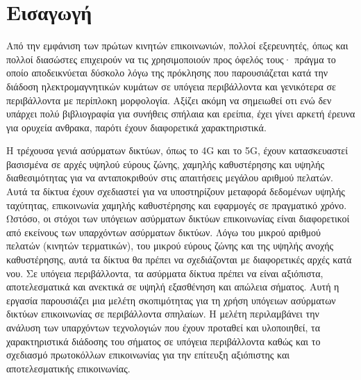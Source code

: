 \section{\textsf{Εισαγωγή}}
    Από την εμφάνιση των πρώτων κινητών επικοινωνιών, πολλοί εξερευνητές, όπως και
    πολλοί διασώστες επιχειρούν να τις χρησιμοποιούν προς όφελός τους· πράγμα το οποίο
    αποδεικνύεται δύσκολο λόγω της πρόκλησης που παρουσιάζεται κατά την διάδοση
    ηλεκτρομαγνητικών κυμάτων σε υπόγεια περιβάλλοντα και γενικότερα σε περιβάλλοντα
    με περίπλοκη μορφολογία. Αξίζει ακόμη να σημειωθεί οτι ενώ δεν υπάρχει πολύ
    βιβλιογραφία για συνήθεις σπήλαια και ερείπια, έχει γίνει αρκετή έρευνα για
    ορυχεία ανθρακα, παρότι έχουν διαφορετικά χαρακτηριστικά.

    Η τρέχουσα γενιά ασύρματων δικτύων, όπως το 4G και το 5G, έχουν κατασκευαστεί
    βασισμένα σε αρχές υψηλού εύρους ζώνης, χαμηλής καθυστέρησης και υψηλής
    διαθεσιμότητας για να ανταποκριθούν στις απαιτήσεις μεγάλου αριθμού πελατών. Αυτά
    τα δίκτυα έχουν σχεδιαστεί για να υποστηρίζουν μεταφορά δεδομένων υψηλής
    ταχύτητας, επικοινωνία χαμηλής καθυστέρησης και εφαρμογές σε πραγματικό χρόνο.
    Ωστόσο, οι στόχοι των υπόγειων ασύρματων δικτύων επικοινωνίας είναι διαφορετικοί
    από εκείνους των υπαρχόντων ασύρματων δικτύων. Λόγω του μικρού αριθμού πελατών
    (κινητών τερματικών), του μικρού εύρους ζώνης και της υψηλής ανοχής καθυστέρησης,
    αυτά τα δίκτυα θα πρέπει να σχεδιάζονται με διαφορετικές αρχές κατά νου. Σε
    υπόγεια περιβάλλοντα, τα ασύρματα δίκτυα πρέπει να είναι αξιόπιστα, αποτελεσματικά
    και ανεκτικά σε υψηλή εξασθένηση και απώλεια σήματος.
    Αυτή η εργασία παρουσιάζει μια μελέτη σκοπιμότητας για τη χρήση υπόγειων ασύρματων
    δικτύων επικοινωνίας σε περιβάλλοντα σπηλαίων. Η μελέτη περιλαμβάνει την ανάλυση
    των υπαρχόντων τεχνολογιών που έχουν προταθεί και υλοποιηθεί, τα χαρακτηριστικά
    διάδοσης του σήματος σε υπόγεια περιβάλλοντα καθώς και το σχεδιασμό πρωτοκόλλων
    επικοινωνίας για την επίτευξη αξιόπιστης και αποτελεσματικής επικοινωνίας.

